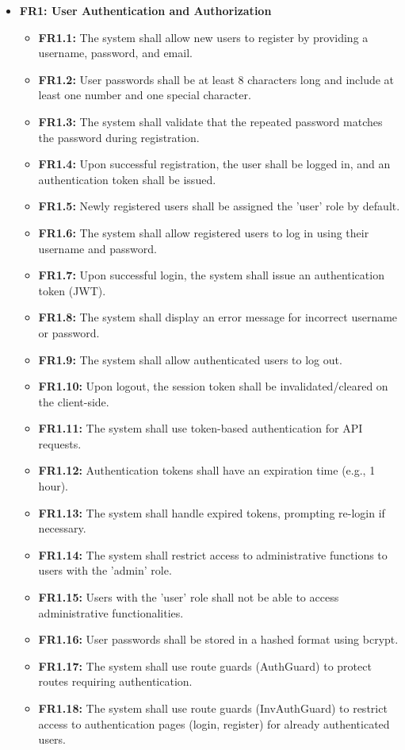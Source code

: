 \begin{itemize}
    \item \textbf{FR1: User Authentication and Authorization}
    \begin{itemize}
        \item \textbf{FR1.1:} The system shall allow new users to register by providing a username, password, and email.
        \item \textbf{FR1.2:} User passwords shall be at least 8 characters long and include at least one number and one special character.
        \item \textbf{FR1.3:} The system shall validate that the repeated password matches the password during registration.
        \item \textbf{FR1.4:} Upon successful registration, the user shall be logged in, and an authentication token shall be issued.
        \item \textbf{FR1.5:} Newly registered users shall be assigned the 'user' role by default.
        \item \textbf{FR1.6:} The system shall allow registered users to log in using their username and password.
        \item \textbf{FR1.7:} Upon successful login, the system shall issue an authentication token (JWT).
        \item \textbf{FR1.8:} The system shall display an error message for incorrect username or password.
        \item \textbf{FR1.9:} The system shall allow authenticated users to log out.
        \item \textbf{FR1.10:} Upon logout, the session token shall be invalidated/cleared on the client-side.
        \item \textbf{FR1.11:} The system shall use token-based authentication for API requests.
        \item \textbf{FR1.12:} Authentication tokens shall have an expiration time (e.g., 1 hour).
        \item \textbf{FR1.13:} The system shall handle expired tokens, prompting re-login if necessary.
        \item \textbf{FR1.14:} The system shall restrict access to administrative functions to users with the 'admin' role.
        \item \textbf{FR1.15:} Users with the 'user' role shall not be able to access administrative functionalities.
        \item \textbf{FR1.16:} User passwords shall be stored in a hashed format using bcrypt.
        \item \textbf{FR1.17:} The system shall use route guards (AuthGuard) to protect routes requiring authentication.
        \item \textbf{FR1.18:} The system shall use route guards (InvAuthGuard) to restrict access to authentication pages (login, register) for already authenticated users.
    \end{itemize}


\end{itemize}
